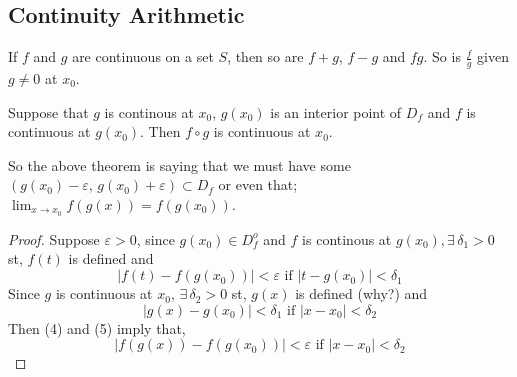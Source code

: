 \documentclass{article}
\newcommand{\sub}{\subset}
\renewcommand{\d}{\delta}
\newcommand{\e}{\varepsilon}
\newcommand{\ex}{\exists\,}
\begin{document}
\subsection{Continuity Arithmetic}
\begin{theorem}{}{}
  If $f$ and $g$ are continuous on a set $S$, then so are $f + g$, $f - g$ and $fg$. So is $\displaystyle{\frac{f}{g}}$ given $g\neq 0$ at $x_0$.
\end{theorem}

\begin{theorem}{}{}
  Suppose that $g$ is continous at $x_0$, $g(x_0)$ is an interior point of $D_f$ and $f$ is continuous at $g(x_0)$. Then $f\circ g$ is continuous at $x_0$.
\end{theorem}
\begin{figure}[H]
\end{figure}

So the above theorem is saying that we must have some $(g(x_0) - \e,\, g(x_0) + \e) \sub D_f$ or even that; $\displaystyle{\lim_{x\to x_0}{f(g(x))} = f(g(x_0))}$.

\begin{proof}
  Suppose $\e>0$, since $g(x_0)\in D_f^o$ and $f$ is continous at $g(x_0), \ex\d_1>0$ st, $f(t)$ is defined and
  \begin{equation}
    |f(t) - f(g(x_0))|<\e \text{ if } |t - g(x_0)| < \d_1
  \end{equation}
  Since $g$ is continuous at $x_0$, $\ex\d_2>0$ st, $g(x)$ is defined (why?) and
  \begin{equation}
    |g(x) - g(x_0)| < \d_1 \text{ if } |x - x_0|<\d_2
  \end{equation}
  Then (4) and (5) imply that,
  $$ |f(g(x)) - f(g(x_0))| < \e \text{ if } |x - x_0| < \d_2 $$

\end{proof}
\end{document}
